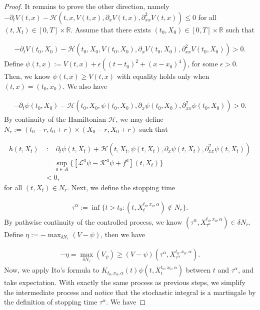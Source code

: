 \documentclass{article}
\begin{document}
\begin{proof}
It remains to prove the other direction, namely $-\partial_tV(t,x)-\mathcal{H}(t,x,V(t,x),\partial_xV(t,x),\partial^2_{xx}V(t,x))\leq0$ for all $(t,X_t)\in[0,T]\times\mathbb{R}$. Assume that there exists $(t_0,X_0)\in[0,T]\times\mathbb{R}$ such that 

\begin{equation*}
\begin{aligned}
-\partial_tV(t_0,X_0)-\mathcal{H}(t_0,X_0,V(t_0,X_0),\partial_xV(t_0,X_0),\partial^2_{xx}V(t_0,X_0))>0.
\end{aligned}
\end{equation*}
Define $\psi(t,x):=V(t,x)+\epsilon((t-t_0)^2+(x-x_0)^4)$, for some $\epsilon>0$. Then, we know $\psi(t,x)\geq V(t,x)$ with equality holds only when $(t,x)=(t_0,x_0)$. We also have

\begin{equation*}
\begin{aligned}
-\partial_t\psi(t_0,X_0)-\mathcal{H}(t_0,X_0,\psi(t_0,X_0),\partial_x\psi(t_0,X_0),\partial^2_{xx}\psi(t_0,X_0))>0.
\end{aligned}
\end{equation*}
By continuity of the Hamiltonian $\mathcal{H}$, we may define $N_r:=(t_0-r,t_0+r)\times(X_0-r,X_0+r)$ such that 

\begin{equation*}
\begin{aligned}
h(t,X_t)&:=\partial_t\psi(t,X_t)+\mathcal{H}(t,X_t,\psi(t,X_t),\partial_x\psi(t,X_t),\partial^2_{xx}\psi(t,X_t))\\
&=\sup_{a\in A}\{[\mathcal{L}^a\psi-\mathcal{K}^a\psi+f^a](t,X_t)\}\\
&<0,
\end{aligned}
\end{equation*}
for all $(t,X_t)\in N_r$. Next, we define the stopping time

\begin{equation*}
\begin{aligned}
\tau^\alpha:=\inf\{t>t_0:(t,X_t^{t_0,x_0,\alpha})\notin N_r\}.
\end{aligned}
\end{equation*}
By pathwise continuity of the controlled process, we know $(\tau^\alpha,X_{\tau^\alpha}^{t_0,x_0,\alpha})\in\delta N_r$. Define $\eta:=-\max_{\delta N_r}(V-\psi)$, then we have

\begin{equation*}
\begin{aligned}
-\eta=\max_{\delta N_r}(V_\psi)\geq(V-\psi)(\tau^\alpha,X_{\tau^\alpha}^{t_0,x_0,\alpha}).
\end{aligned}
\end{equation*}
Now, we apply Ito's formula to $K_{t_0,x_0,\alpha}(t)\psi(t,X_t^{t_0,x_0,\alpha})$ between $t$ and $\tau^\alpha$, and take expectation. With exactly the same process as previous steps, we simplify the intermediate process and notice that the stochastic integral is a martingale by the definition of stopping time $\tau^\alpha$. We have


\end{proof}
\end{document}
